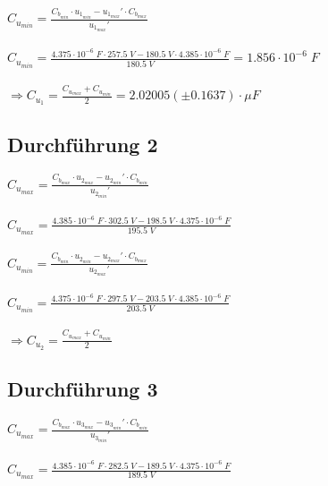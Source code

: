 \documentclass[a4paper,12pt]{article}
\begin{document}
$C_{u_{min}} = \displaystyle{\frac{C_{b_{min}}\cdot u_{1_{min}}-u_{1_{max}}'\cdot C_{b_{max}}}{u_{1_{max}}'}}$\\\\

$C_{u_{min}} = \displaystyle{\frac{4.375\cdot 10^{-6}\;F\cdot 257.5\;V-180.5\;V\cdot 4.385\cdot 10^{-6}\;F}{180.5\;V}} = 1.856\cdot 10^{-6}\;F$\\\\

$\Rightarrow C_{u_1}=\displaystyle{\frac{C_{u_{max}}+C_{u_{min}}}{2}} = 2.02005 (\pm 0.1637)\cdot \mu F$

\subsection{Durchführung 2}

$C_{u_{max}} = \displaystyle{\frac{C_{b_{max}}\cdot u_{2_{max}}-u_{2_{min}}'\cdot C_{b_{min}}}{u_{2_{min}}'}}$\\\\

$C_{u_{max}} = \displaystyle{\frac{4.385\cdot 10^{-6}\;F\cdot 302.5\;V-198.5\;V\cdot 4.375\cdot 10^{-6}\;F}{195.5\;V}}$\\\\

$C_{u_{min}} = \displaystyle{\frac{C_{b_{min}}\cdot u_{2_{min}}-u_{2_{max}}'\cdot C_{b_{max}}}{u_{2_{max}}'}}$\\\\

$C_{u_{min}} = \displaystyle{\frac{4.375\cdot 10^{-6}\;F\cdot 297.5\;V-203.5\;V\cdot 4.385\cdot 10^{-6}\;F}{203.5\;V}}$\\\\

$\Rightarrow C_{u_2}=\displaystyle{\frac{C_{u_{max}}+C_{u_{min}}}{2}}$

\subsection{Durchführung 3}

$C_{u_{max}} = \displaystyle{\frac{C_{b_{max}}\cdot u_{3_{max}}-u_{3_{min}}'\cdot C_{b_{min}}}{u_{3_{min}}'}}$\\\\

$C_{u_{max}} = \displaystyle{\frac{4.385\cdot 10^{-6}\;F\cdot 282.5\;V-189.5\;V\cdot 4.375\cdot 10^{-6}\;F}{189.5\;V}}$\\\\
\end{document}
